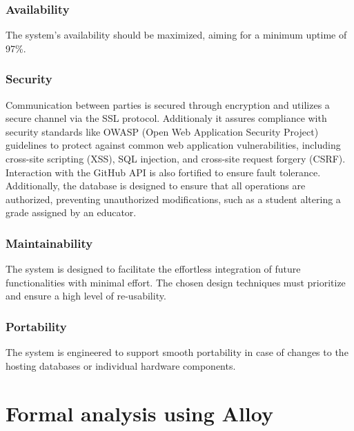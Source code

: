 \documentclass[12pt,oneside,a4paper]{article}
\begin{document}
\subsubsection{Availability}
The system's availability should be maximized, aiming for a minimum uptime of 97\%.
\subsubsection{Security}
Communication between parties is secured through encryption and utilizes a secure channel via the SSL protocol. Additionaly it assures compliance with security standards like OWASP (Open Web Application Security Project) guidelines to protect against common web application vulnerabilities, including cross-site scripting (XSS), SQL injection, and cross-site request forgery (CSRF). Interaction with the GitHub API is also fortified to ensure fault tolerance. Additionally, the database is designed to ensure that all operations are authorized, preventing unauthorized modifications, such as a student altering a grade assigned by an educator.
\subsubsection{Maintainability}
The system is designed to facilitate the effortless integration of future functionalities with minimal effort. The chosen design techniques must prioritize and ensure a high level of re-usability.

\subsubsection{Portability}
The system is engineered to support smooth portability in case of changes to the hosting databases or individual hardware components.

\clearpage

\section{Formal analysis using Alloy}
\end{document}
